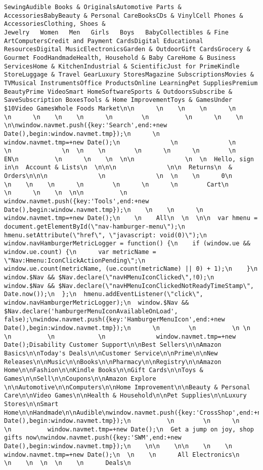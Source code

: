 \documentclass[
]{article}
\begin{document}
\begin{verbatim}
SewingAudible Books & OriginalsAutomotive Parts & AccessoriesBabyBeauty & Personal CareBooksCDs & VinylCell Phones & AccessoriesClothing, Shoes & Jewelry   Women   Men   Girls   Boys   BabyCollectibles & Fine ArtComputersCredit and Payment CardsDigital Educational ResourcesDigital MusicElectronicsGarden & OutdoorGift CardsGrocery & Gourmet FoodHandmadeHealth, Household & Baby CareHome & Business ServicesHome & KitchenIndustrial & ScientificJust for PrimeKindle StoreLuggage & Travel GearLuxury StoresMagazine SubscriptionsMovies & TVMusical InstrumentsOffice ProductsOnline LearningPet SuppliesPremium BeautyPrime VideoSmart HomeSoftwareSports & OutdoorsSubscribe & SaveSubscription BoxesTools & Home ImprovementToys & GamesUnder $10Video GamesWhole Foods Market\n\n      \n    \n    \n      \n        \n      \n    \n    \n      \n        \n          \n      \n    \n  \n\nwindow.navmet.push({key:'Search',end:+new Date(),begin:window.navmet.tmp});\n      \n          window.navmet.tmp=+new Date();\n              \n              \n              \n              \n  \n    \n        \n      \n      \n        \n          EN\n          \n      \n    \n  \n\n              \n  \n  Hello, sign in\n  Account & Lists\n  \n\n\n              \n\n  Returns\n  & Orders\n\n\n              \n              \n  \n    \n      0\n      \n    \n    \n      \n        \n      \n      \n        Cart\n        \n      \n    \n  \n\n          \n          window.navmet.push({key:'Tools',end:+new Date(),begin:window.navmet.tmp});\n    \n    \n      \n        window.navmet.tmp=+new Date();\n    \n    All\n  \n  \n\n  var hmenu = document.getElementById(\"nav-hamburger-menu\");\n  hmenu.setAttribute(\"href\", \"javascript: void(0)\");\n  window.navHamburgerMetricLogger = function() {\n    if (window.ue && window.ue.count) {\n      var metricName = \"Nav:Hmenu:IconClickActionPending\";\n      window.ue.count(metricName, (ue.count(metricName) || 0) + 1);\n    }\n    window.$Nav && $Nav.declare(\"navHMenuIconClicked\",!0);\n    window.$Nav && $Nav.declare(\"navHMenuIconClickedNotReadyTimeStamp\", Date.now());\n  };\n  hmenu.addEventListener(\"click\", window.navHamburgerMetricLogger);\n  window.$Nav && $Nav.declare('hamburgerMenuIconAvailableOnLoad', false);\nwindow.navmet.push({key:'HamburgerMenuIcon',end:+new Date(),begin:window.navmet.tmp});\n      \n        \n          \n \n \n          \n            \n              window.navmet.tmp=+new Date();Disability Customer Support\n\nBest Sellers\n\nAmazon Basics\n\nToday's Deals\n\nCustomer Service\n\nPrime\n\nNew Releases\n\nMusic\n\nBooks\n\nPharmacy\n\nRegistry\n\nAmazon Home\n\nFashion\n\nKindle Books\n\nGift Cards\n\nToys & Games\n\nSell\n\nCoupons\n\nAmazon Explore \n\nAutomotive\n\nComputers\n\nHome Improvement\n\nBeauty & Personal Care\n\nVideo Games\n\nHealth & Household\n\nPet Supplies\n\nLuxury Stores\n\nSmart Home\n\nHandmade\n\nAudible\nwindow.navmet.push({key:'CrossShop',end:+new Date(),begin:window.navmet.tmp});\n          \n        \n      \n      \n          window.navmet.tmp=+new Date();\n  Get a jump on joy, shop gifts now\nwindow.navmet.push({key:'SWM',end:+new Date(),begin:window.navmet.tmp});\n    \n\n    \n\n    \n    \n      window.navmet.tmp=+new Date();\n  \n    \n      All Electronics\n      \n    \n  \n  \n    \n      Deals\n  
\end{verbatim}
\end{document}
